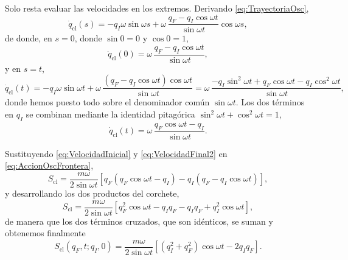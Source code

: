         Solo resta evaluar las velocidades en los extremos. Derivando \eqref{eq:TrayectoriaOsc},
        \begin{equation}\label{eq:VelocidadOsc}
            \dot{q}_{\mathrm{cl}}(s) = -q_{I}\omega\sin\omega s + \omega\,\frac{q_{F}-q_{I}\cos\omega t}{\sin\omega t}\cos\omega s,
        \end{equation}
        de donde, en $s=0$, donde $\sin 0 = 0$ y $\cos 0 = 1$,
        \begin{equation}\label{eq:VelocidadInicial}
            \dot{q}_{\mathrm{cl}}(0) = \omega\,\frac{q_{F}-q_{I}\cos\omega t}{\sin\omega t},
        \end{equation}
        y en $s=t$,
        \begin{equation}\label{eq:VelocidadFinal}
            \dot{q}_{\mathrm{cl}}(t) = -q_{I}\omega\sin\omega t + \omega\,\frac{\left(q_{F}-q_{I}\cos\omega t\right)\cos\omega t}{\sin\omega t}
            = \omega\,\frac{-q_{I}\sin^{2}\omega t + q_{F}\cos\omega t - q_{I}\cos^{2}\omega t}{\sin\omega t},
        \end{equation}
        donde hemos puesto todo sobre el denominador común $\sin\omega t$. Los dos términos en $q_{I}$ se combinan mediante la identidad pitagórica $\sin^{2}\omega t + \cos^{2}\omega t = 1$,
        \begin{equation}\label{eq:VelocidadFinal2}
            \dot{q}_{\mathrm{cl}}(t) = \omega\,\frac{q_{F}\cos\omega t - q_{I}}{\sin\omega t} .
        \end{equation}

        Sustituyendo \eqref{eq:VelocidadInicial} y \eqref{eq:VelocidadFinal2} en \eqref{eq:AccionOscFrontera},
        \begin{equation}\label{eq:AccionOsc3}
            S_{\mathrm{cl}} = \frac{m\omega}{2\sin\omega t}\left[q_{F}\left(q_{F}\cos\omega t - q_{I}\right) - q_{I}\left(q_{F} - q_{I}\cos\omega t\right)\right],
        \end{equation}
        y desarrollando los dos productos del corchete,
        \begin{equation}\label{eq:AccionOsc4}
            S_{\mathrm{cl}} = \frac{m\omega}{2\sin\omega t}\left[q_{F}^{2}\cos\omega t - q_{I}q_{F} - q_{I}q_{F} + q_{I}^{2}\cos\omega t\right],
        \end{equation}
        de manera que los dos términos cruzados, que son idénticos, se suman y obtenemos finalmente
        \begin{equation}\label{eq:AccionOscilador}
            \boxed{\;S_{\mathrm{cl}}(q_{F},t;q_{I},0) = \frac{m\omega}{2\sin\omega t}\left[\left(q_{I}^{2}+q_{F}^{2}\right)\cos\omega t - 2q_{I}q_{F}\right].\;}
        \end{equation}

